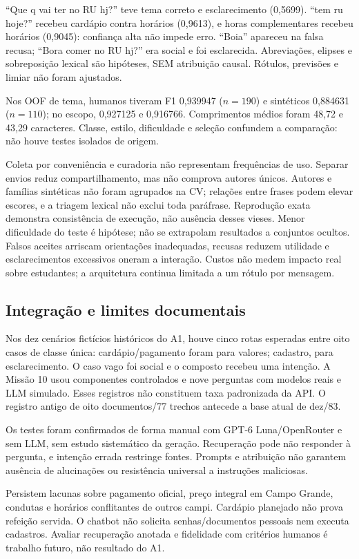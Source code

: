 \documentclass[12pt]{article}
\begin{document}
“Que q vai ter no RU hj?” teve tema correto e esclarecimento (0,5699).
“tem ru hoje?” recebeu cardápio contra horários (0,9613), e horas complementares
recebeu horários (0,9045): confiança alta não impede erro.
“Boia” apareceu na falsa recusa; “Bora comer no RU hj?” era social e foi
esclarecida. Abreviações, elipses e sobreposição lexical são hipóteses,
SEM atribuição causal. Rótulos, previsões e limiar não foram ajustados.

Nos OOF de tema, humanos tiveram F1 0,939947 (\(n=190\)) e sintéticos
0,884631 (\(n=110\)); no escopo, 0,927125 e 0,916766.
Comprimentos médios foram 48,72 e 43,29 caracteres. Classe, estilo,
dificuldade e seleção confundem a comparação: não houve testes isolados de origem.

Coleta por conveniência e curadoria não representam frequências de uso.
Separar envios reduz compartilhamento, mas não comprova autores únicos.
Autores e famílias sintéticas não foram agrupados na CV; relações entre frases
podem elevar escores, e a triagem lexical não exclui toda paráfrase.
Reprodução exata demonstra consistência de execução, não ausência desses vieses.
Menor dificuldade do teste é hipótese; não se extrapolam resultados a conjuntos
ocultos. Falsos aceites arriscam orientações inadequadas, recusas reduzem utilidade
e esclarecimentos excessivos oneram a interação. Custos não medem impacto real
sobre estudantes; a arquitetura continua limitada a um rótulo por mensagem.

\subsection{Integração e limites documentais}
Nos dez cenários fictícios históricos do A1, houve cinco rotas esperadas entre
oito casos de classe única: cardápio/pagamento foram para valores; cadastro,
para esclarecimento. O caso vago foi social e o composto recebeu uma intenção.
A Missão 10 usou componentes controlados e nove perguntas com modelos reais
e LLM simulado. Esses registros não constituem taxa padronizada da API.
O registro antigo de oito documentos/77 trechos antecede a base atual de dez/83.

Os testes foram confirmados de forma manual com GPT-6 Luna/OpenRouter e sem LLM,
sem estudo sistemático da geração. Recuperação pode não responder à pergunta,
e intenção errada restringe fontes. Prompts e atribuição não garantem ausência
de alucinações ou resistência universal a instruções maliciosas.

Persistem lacunas sobre pagamento oficial, preço integral em Campo Grande,
condutas e horários conflitantes de outros campi. Cardápio planejado não prova
refeição servida. O chatbot não solicita senhas/documentos pessoais nem executa
cadastros. Avaliar recuperação anotada e fidelidade com critérios humanos é
trabalho futuro, não resultado do A1.
\end{document}
